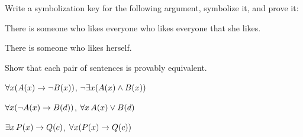 \solutions
\problempart
\label{pr.likes}
Write a symbolization key for the following argument, symbolize it, and prove it:
\begin{earg}
\item There is someone who likes everyone who likes everyone that she
likes. 
\item[\texttherefore] There is someone who likes herself.
\end{earg}

\problempart
Show that each pair of sentences is provably equivalent.
\begin{compactlist}
\item $\forall x (A(x)\rightarrow \neg B(x))$, $\neg\exists x(A(x) \wedge B(x))$
\item $\forall x (\neg A(x)\rightarrow B(d))$, $\forall x\,A(x) \vee B(d)$
\item $\exists x\,P(x) \rightarrow Q(c)$, $\forall x (P(x) \rightarrow Q(c))$
\end{compactlist}


